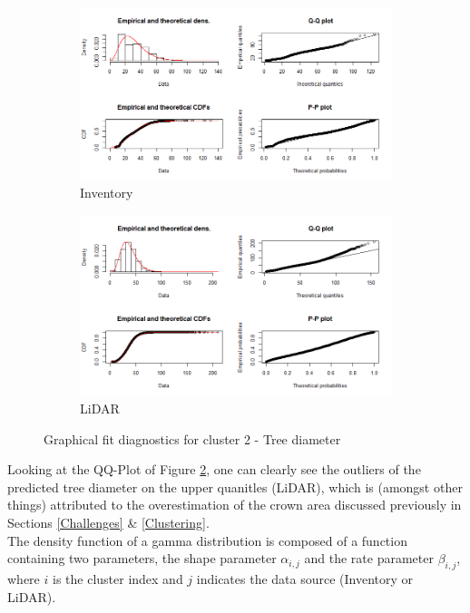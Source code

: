 \begin{figure}[H]
\centering
\begin{subfigure}{.5\textwidth}
  \centering
  \includegraphics[width=.9\linewidth]{cluster2_valid.png}
  \caption{Inventory}
  \label{fig:cluster2_valid}
\end{subfigure}%
\begin{subfigure}{.5\textwidth}
  \centering
  \includegraphics[width=0.85\linewidth]{cluster2_pred.png}
  \caption{LiDAR}
  \label{fig:cluster2_pred}
\end{subfigure}
\caption{Graphical fit diagnostics for cluster 2 - Tree diameter}
\label{fig:Fits}
\end{figure}

Looking at the QQ-Plot of Figure \ref{fig:cluster2_pred}, one can clearly see the outliers of the predicted tree diameter on the upper quanitles (LiDAR), which is (amongst other things) attributed to the overestimation of the crown area discussed previously in Sections \ref{Challenges} \& \ref{Clustering}.\\

The density function of a gamma distribution is composed of a function containing two parameters, the shape parameter $\alpha_{i,j}$ and the rate parameter $\beta_{i,j}$, where $i$ is the cluster index and 
$j$ indicates the data source (Inventory or LiDAR). \\


